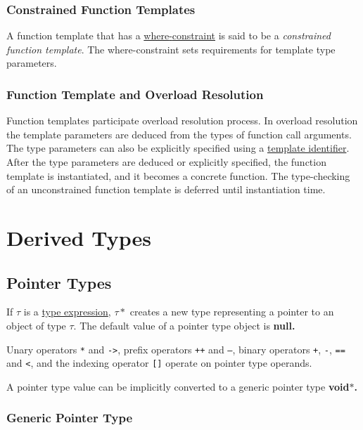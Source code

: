 \documentclass[a4paper,oneside,11pt]{article}
\begin{document}
\subsubsection{Constrained Function Templates}

A function template that has a \hyperref[whereconstraint]{where\textrm{-}constraint} is said to be a
\emph{constrained function template}.
The where-constraint sets requirements for template type parameters.

\subsubsection{Function Template and Overload Resolution}

Function templates participate overload resolution process.
In overload resolution the template parameters are deduced from the types of function call arguments.
The type parameters can also be explicitly specified using a \hyperref[templateid]{template identifier}.
After the type parameters are deduced or explicitly specified, the function template is instantiated,
and it becomes a concrete function.
The type-checking of an unconstrained function template is deferred until instantiation time.

\section{Derived Types}

\subsection{Pointer Types}\label{sec:pointertypes}

If $\tau$ is a \hyperref[typeexpr]{type expression}, $\tau*$ creates a new type representing a pointer to an object of type $\tau$.
The default value of a pointer type object is \bf{null}.

Unary operators \texttt{*} and \texttt{->}, prefix operators \texttt{++} and \texttt{--},
binary operators \texttt{+}, \texttt{-}, \texttt{==} and \texttt{<},
and the indexing operator \texttt{[]} operate on pointer type operands.

A pointer type value can be implicitly converted to a generic pointer type \bf{void$*$}.

\subsubsection{Generic Pointer Type}
\end{document}
